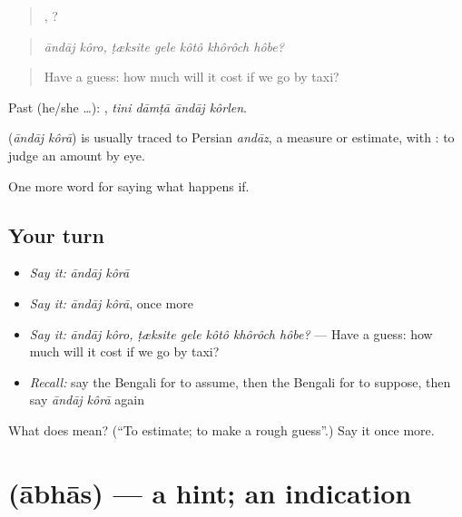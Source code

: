 \begin{quote}
 ,     ?
\end{quote}

\begin{quote}
\emph{āndāj kôro, ṭæksite gele kôtô khôrôch hôbe?}
\end{quote}

\begin{quote}
Have a guess: how much will it cost if we go by taxi?
\end{quote}

Past (he/she …):    , \emph{tini dāmṭā āndāj kôrlen}.

\begin{cousinweb}
\textbf{ } (\emph{āndāj kôrā}) is usually traced to Persian \emph{andāz}, a measure or estimate, with : to judge an amount by eye.
\end{cousinweb}

\begin{grammarlens}[title={What you've built}]
One more word for saying what happens if.
\end{grammarlens}

\subsection*{Your turn}
\begin{itemize}
\raggedright
  \item \emph{Say it:} \emph{āndāj kôrā}
  \item \emph{Say it:} \emph{āndāj kôrā}, once more
  \item \emph{Say it:} \emph{āndāj kôro, ṭæksite gele kôtô khôrôch hôbe?} — Have a guess: how much will it cost if we go by taxi?
  \item \emph{Recall:} say the Bengali for to assume, then the Bengali for to suppose, then say \emph{āndāj kôrā} again
\end{itemize}

\begin{tcolorbox}[breakable,colback=teal!4,colframe=teal!35!black,title={Before you move on}]
What does   mean? (\textquotedblleft{}To estimate; to make a rough guess\textquotedblright{}.) Say it once more.
\end{tcolorbox}
\section[\texorpdfstring{\bn{আভাস} (ābhās)}{আভাস (ābhās)}]{ (ābhās) — a hint; an indication}

